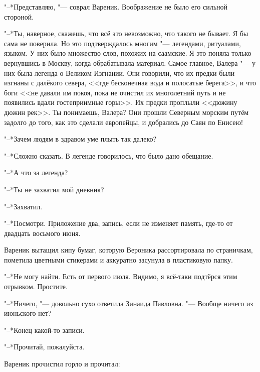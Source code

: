 "--*Представляю, "--- соврал Вареник.
Воображение не было его сильной стороной.

"--*Ты, наверное, скажешь, что всё это невозможно, что такого не бывает.
Я бы сама не поверила.
Но это подтверждалось многим "--- легендами, ритуалами, языком.
У них было множество слов, похожих на саамские.
Я это поняла только вернувшись в Москву, когда обрабатывала материал.
Самое главное, Валера "--- у них была легенда о Великом Изгнании.
Они говорили, что их предки были изгнаны с далёкого севера, <<где бесконечная вода и полосатые берега>>, и что боги <<не давали им покоя, пока не очистил их многолетний путь и не появились вдали гостеприимные горы>>.
Их предки проплыли <<дюжину дюжин рек>>.
Ты понимаешь, Валера?
Они прошли Северным морским путём задолго до того, как это сделали европейцы, и добрались до Саян по Енисею!

"--*Зачем людям в здравом уме плыть так далеко?

"--*Сложно сказать.
В легенде говорилось, что было дано обещание.

"--*А что за легенда?

"--*Ты не захватил мой дневник?

"--*Захватил.

"--*Посмотри.
Приложение два, запись, если не изменяет память, где-то от двадцать восьмого июня.

Вареник вытащил кипу бумаг, которую Вероника рассортировала по страничкам, пометила цветными стикерами и аккуратно засунула в пластиковую папку.

"--*Не могу найти.
Есть от первого июля.
Видимо, я всё-таки подтёрся этим отрывком.
Простите.

"--*Ничего, "--- довольно сухо ответила Зинаида Павловна.
"--- Вообще ничего из июньского нет?

"--*Конец какой-то записи.

"--*Прочитай, пожалуйста.

Вареник прочистил горло и прочитал:


